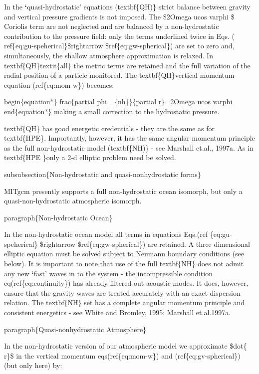 \documentclass[letterpaper,10pt,english]{sphinxmanual}
\begin{document}
In the {\color{red}\bfseries{}{}`}quasi-hydrostatic' equations (textbf\{QH)\} strict balance between
gravity and vertical pressure gradients is not imposed. The \$2Omega ucos
varphi \$ Coriolis term are not neglected and are balanced by a non-hydrostatic
contribution to the pressure field: only the terms underlined twice in Eqs. (
ref\{eq:gu-speherical\}\$rightarrow \$ref\{eq:gw-spherical\}) are set to zero
and, simultaneously, the shallow atmosphere approximation is relaxed. In
textbf\{QH\}textit\{all\} the metric terms are retained and the full
variation of the radial position of a particle monitored. The textbf\{QH\}vertical momentum equation (ref\{eq:mom-w\}) becomes:

begin\{equation*\}
frac\{partial phi \_\{nh\}\}\{partial r\}=2Omega ucos varphi
end\{equation*\}
making a small correction to the hydrostatic pressure.

textbf\{QH\} has good energetic credentials - they are the same as for
textbf\{HPE\}. Importantly, however, it has the same angular momentum
principle as the full non-hydrostatic model (textbf\{NH)\} - see Marshall
et.al., 1997a. As in textbf\{HPE \}only a 2-d elliptic problem need be solved.

subsubsection\{Non-hydrostatic and quasi-nonhydrostatic forms\}

MITgcm presently supports a full non-hydrostatic ocean isomorph, but
only a quasi-non-hydrostatic atmospheric isomorph.

paragraph\{Non-hydrostatic Ocean\}

In the non-hydrostatic ocean model all terms in equations Eqs.(ref
\{eq:gu-speherical\} \$rightarrow \$ref\{eq:gw-spherical\}) are retained. A
three dimensional elliptic equation must be solved subject to Neumann
boundary conditions (see below). It is important to note that use of the
full textbf\{NH\} does not admit any new {\color{red}\bfseries{}{}`}fast' waves in to the system - the
incompressible condition eq(ref\{eq:continuity\}) has already filtered out
acoustic modes. It does, however, ensure that the gravity waves are treated
accurately with an exact dispersion relation. The textbf\{NH\} set has a
complete angular momentum principle and consistent energetics - see White
and Bromley, 1995; Marshall et.al.1997a.

paragraph\{Quasi-nonhydrostatic Atmosphere\}

In the non-hydrostatic version of our atmospheric model we approximate \$dot\{
r\}\$ in the vertical momentum eqs(ref\{eq:mom-w\}) and (ref\{eq:gv-spherical\})
(but only here) by:
\end{document}
